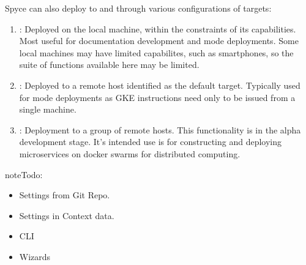 \documentclass[letterpaper,12pt,english,openany,oneside]{sphinxmanual}
\begin{document}
\sphinxAtStartPar
Spyce can also deploy to and through various configurations of targets:
\begin{enumerate}
%
\item {} 
\sphinxAtStartPar
{}: Deployed on the local machine, within the constraints of its capabilities. Most useful for documentation development and  mode deployments. Some local machines may have limited capabilites, such as smartphones, so the suite of functions available here may be limited.

\item {} 
\sphinxAtStartPar
{}: Deployed to a remote host identified as the default target. Typically used for  mode deployments as GKE instructions need only to be issued from a single machine.

\item {} 
\sphinxAtStartPar
{}: Deployment to a group of remote hosts. This functionality is in the alpha development stage. It’s intended use is for constructing and deploying microservices on docker swarms for distributed computing.

\end{enumerate}

\begin{sphinxadmonition}{note}{\label{\detokenize{euidev/development/_autosummary/spyce:id1}}Todo:}\begin{itemize}
\item {} 
\sphinxAtStartPar
Settings from Git Repo.

\item {} 
\sphinxAtStartPar
Settings in Context data.

\item {} 
\sphinxAtStartPar
CLI

\item {} 
\sphinxAtStartPar
Wizards

\end{itemize}
\end{sphinxadmonition}

\sphinxstepscope
\end{document}
